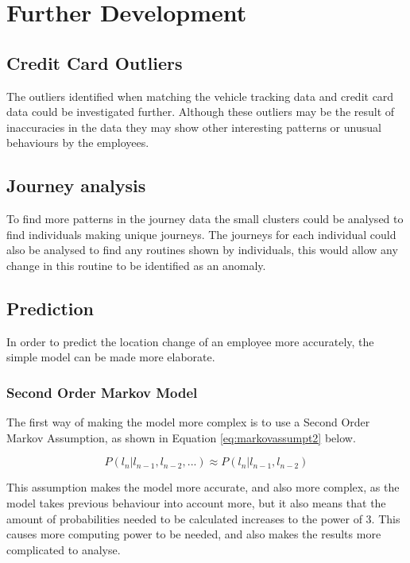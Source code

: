 \section{Further Development}
\label{sec:furtherdevelop}

\subsection{Credit Card Outliers}
\noindent The outliers identified when matching the vehicle tracking data and credit card data could be investigated further. Although these outliers may be the result of inaccuracies in the data they may show other interesting patterns or unusual behaviours by the employees. 

\subsection{Journey analysis}
To find more patterns in the journey data the small clusters could be analysed to find individuals making unique journeys. The journeys for each individual could also be analysed to find any routines shown by individuals, this would allow any change in this routine to be identified as an anomaly.

\subsection{Prediction}
In order to predict the location change of an employee more accurately, the simple model can be made more elaborate. 

\subsubsection{Second Order Markov Model}
The first way of making the model more complex is to use a Second Order Markov Assumption, as shown in Equation \ref{eq:markovassumpt2} below. 

\begin{equation}\label{eq:markovassumpt2}P(l_n | l_{n-1}, l_{n-2}, ...)\approx P(l_n | l_{n-1}, l_{n-2})\end{equation}

\noindent This assumption makes the model more accurate, and also more complex, as the model takes previous behaviour into account more, but it also means that the amount of probabilities needed to be calculated increases to the power of 3. This causes more computing power to be needed, and also makes the results more complicated to analyse.


